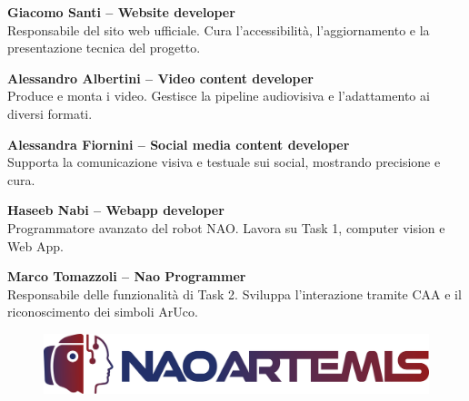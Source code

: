 \documentclass{optica-article}
\begin{document}
\textbf{Giacomo Santi -- Website developer} \\Responsabile del sito web ufficiale. Cura l'accessibilit\`a, l'aggiornamento e la presentazione tecnica del progetto.

\textbf{Alessandro Albertini -- Video content developer} \\Produce e monta i video. Gestisce la pipeline audiovisiva e l'adattamento ai diversi formati.

\textbf{Alessandra Fiornini -- Social media content developer} \\Supporta la comunicazione visiva e testuale sui social, mostrando precisione e cura.

\textbf{Haseeb Nabi -- Webapp developer} \\Programmatore avanzato del robot NAO. Lavora su Task 1, computer vision e Web App.

\textbf{Marco Tomazzoli -- Nao Programmer} \\Responsabile delle funzionalit\`a di Task 2. Sviluppa l'interazione tramite CAA e il riconoscimento dei simboli ArUco.


\begin{figure}[b]
    \centering
    \includegraphics[scale=0.08]{figures/logo_v3.png}
    \label{fig:logo_con_scritta1}
\end{figure}


\end{document}
